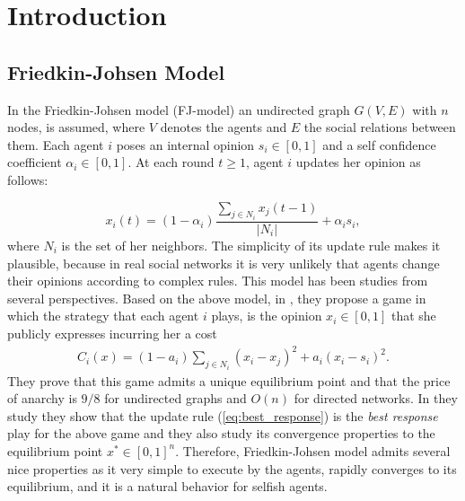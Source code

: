 \section{Introduction}

\subsection{Friedkin-Johsen Model}
In the Friedkin-Johsen model (FJ-model) an undirected graph $G(V,E)$ with $n$
nodes, is assumed, where $V$ denotes the agents and $E$ the social relations between
them. Each agent $i$ poses an internal opinion $s_i \in [0,1]$ and a self confidence coefficient
$\alpha_i \in[0,1]$. At each round $t\geq 1$, agent $i$ updates her opinion
as follows:

\begin{equation}\label{eq:best_response}
  x_i(t) = (1-\alpha_i) \frac{\sum_{j \in N_i}x_j(t-1)}{|N_i|} + \alpha_i s_i,
\end{equation}
where $N_i$ is the set of her neighbors. The simplicity of its update rule makes it plausible, because in
real social networks it is very unlikely that agents change their opinions
according to complex rules. This model has been studies from several perspectives.
Based on the above model, in \cite{BKO11}, they propose a game
in which the strategy that each agent $i$ plays, is the opinion $x_i \in [0,1]$
that she publicly expresses incurring her a cost
\begin{align}\label{eq:kleinberg_cost}
  C_i(x) = (1-a_i) \sum_{j \in N_i} (x_i - x_j)^2 + a_i (x_i - s_i)^2.
\end{align}
They prove that this game admits a unique equilibrium point and that
the price of anarchy is $9/8$ for undirected graphs and $O(n)$ for
directed networks.  In \cite{GS14} they study they show that the update
rule (\ref{eq:best_response}) is the \emph{best response} play for the above
game and they also study its convergence properties to the equilibrium point
$x^* \in [0,1]^n$. Therefore, Friedkin-Johsen model admits several nice properties
as it very simple to execute by the agents, rapidly converges to its equilibrium,
and it is a natural behavior for selfish agents.

